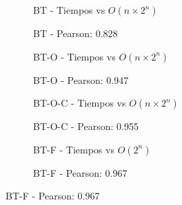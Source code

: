 \begin{figure}[H]
    \centering
    \begin{subfigure}[b]{0.48\textwidth}
        \centering
        
        \caption{BT - Tiempos vs $O(n \times 2^n)$}
    \end{subfigure}
    \hfill
    \begin{subfigure}[b]{0.42\textwidth}
        \centering
        
        \caption{BT - Pearson: 0.828}
    \end{subfigure}

    \begin{subfigure}[b]{0.48\textwidth}
        \centering
        
        \caption{BT-O - Tiempos vs $O(n \times 2^n)$}
    \end{subfigure}
    \hfill
    \begin{subfigure}[b]{0.42\textwidth}
        \centering
        
        \caption{BT-O - Pearson: 0.947}
    \end{subfigure}
    
    \begin{subfigure}[b]{0.48\textwidth}
        \centering
        
        \caption{BT-O-C - Tiempos vs $O(n \times 2^n)$}
    \end{subfigure}
    \hfill
    \begin{subfigure}[b]{0.42\textwidth}
        \centering
        
        \caption{BT-O-C - Pearson: 0.955}
    \end{subfigure}

    \begin{subfigure}[b]{0.48\textwidth}
        \centering
        
        \caption{BT-F - Tiempos vs $O(2^n)$}
    \end{subfigure}
    \hfill
    \begin{subfigure}[b]{0.42\textwidth}
        \centering
        
        \caption{BT-F - Pearson: 0.967}
    \end{subfigure}
\end{figure}

